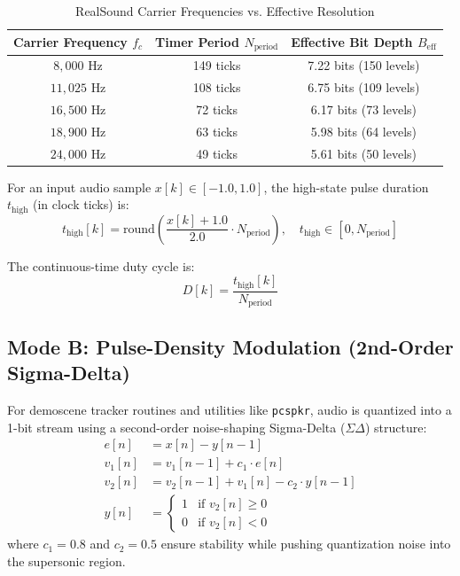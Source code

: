 \documentclass[11pt,a4paper]{article}
\begin{document}
\begin{table}[h]
\centering
\caption{RealSound Carrier Frequencies vs. Effective Resolution}
\begin{tabular}{ccc}
\toprule
Carrier Frequency $f_c$ & Timer Period $N_{\text{period}}$ & Effective Bit Depth $B_{\text{eff}}$ \\
\midrule
$8,000\text{ Hz}$ & 149 ticks & 7.22 bits (150 levels) \\
$11,025\text{ Hz}$ & 108 ticks & 6.75 bits (109 levels) \\
$16,500\text{ Hz}$ & 72 ticks & 6.17 bits (73 levels) \\
$18,900\text{ Hz}$ & 63 ticks & 5.98 bits (64 levels) \\
$24,000\text{ Hz}$ & 49 ticks & 5.61 bits (50 levels) \\
\bottomrule
\end{tabular}
\end{table}

For an input audio sample $x[k] \in [-1.0, 1.0]$, the high-state pulse duration $t_{\text{high}}$ (in clock ticks) is:
\begin{equation}
t_{\text{high}}[k] = \text{round}\left( \frac{x[k] + 1.0}{2.0} \cdot N_{\text{period}} \right), \quad t_{\text{high}} \in [0, N_{\text{period}}]
\end{equation}

The continuous-time duty cycle is:
\begin{equation}
D[k] = \frac{t_{\text{high}}[k]}{N_{\text{period}}}
\end{equation}

\subsection{Mode B: Pulse-Density Modulation (2nd-Order Sigma-Delta)}
For demoscene tracker routines and utilities like \texttt{pcspkr}, audio is quantized into a 1-bit stream using a second-order noise-shaping Sigma-Delta ($\Sigma\Delta$) structure:
\begin{align}
e[n] &= x[n] - y[n-1] \\
v_1[n] &= v_1[n-1] + c_1 \cdot e[n] \\
v_2[n] &= v_2[n-1] + v_1[n] - c_2 \cdot y[n-1] \\
y[n] &= \begin{cases} 1 & \text{if } v_2[n] \ge 0 \\ 0 & \text{if } v_2[n] < 0 \end{cases}
\end{align}
where $c_1 = 0.8$ and $c_2 = 0.5$ ensure stability while pushing quantization noise into the supersonic region.
\end{document}
